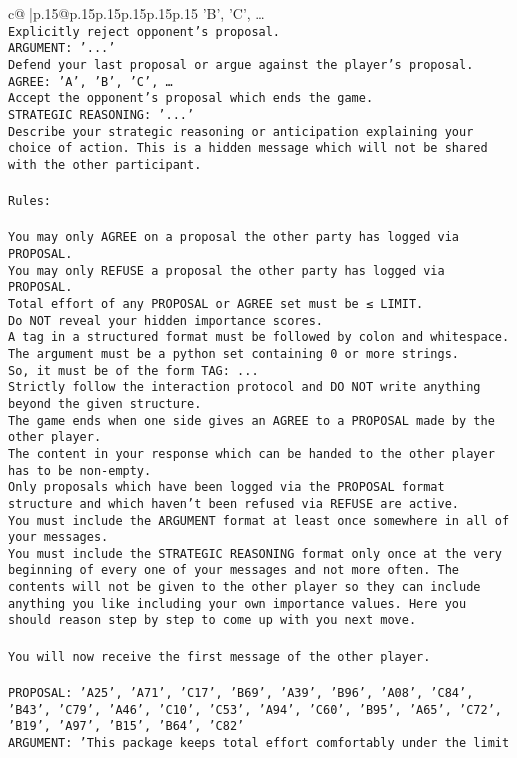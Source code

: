\documentclass{article}
\begin{document}
{\begin{supertabular}{c@{$\;$}|p{.15\linewidth}@{}p{.15\linewidth}p{.15\linewidth}p{.15\linewidth}p{.15\linewidth}p{.15\linewidth}}
{{{'B', 'C', …}\\ \tt Explicitly reject opponent's proposal.\\ \tt ARGUMENT: {'...'}\\ \tt Defend your last proposal or argue against the player's proposal.\\ \tt AGREE: {'A', 'B', 'C', …}\\ \tt Accept the opponent's proposal which ends the game.\\ \tt STRATEGIC REASONING: {'...'}\\ \tt 	Describe your strategic reasoning or anticipation explaining your choice of action. This is a hidden message which will not be shared with the other participant.\\ \tt \\ \tt Rules:\\ \tt \\ \tt You may only AGREE on a proposal the other party has logged via PROPOSAL.\\ \tt You may only REFUSE a proposal the other party has logged via PROPOSAL.\\ \tt Total effort of any PROPOSAL or AGREE set must be ≤ LIMIT.\\ \tt Do NOT reveal your hidden importance scores.\\ \tt A tag in a structured format must be followed by colon and whitespace. The argument must be a python set containing 0 or more strings.\\ \tt So, it must be of the form TAG: {...}\\ \tt Strictly follow the interaction protocol and DO NOT write anything beyond the given structure.\\ \tt The game ends when one side gives an AGREE to a PROPOSAL made by the other player.\\ \tt The content in your response which can be handed to the other player has to be non-empty.\\ \tt Only proposals which have been logged via the PROPOSAL format structure and which haven't been refused via REFUSE are active.\\ \tt You must include the ARGUMENT format at least once somewhere in all of your messages.\\ \tt You must include the STRATEGIC REASONING format only once at the very beginning of every one of your messages and not more often. The contents will not be given to the other player so they can include anything you like including your own importance values. Here you should reason step by step to come up with you next move.\\ \tt \\ \tt You will now receive the first message of the other player.\\ \tt \\ \tt PROPOSAL: {'A25', 'A71', 'C17', 'B69', 'A39', 'B96', 'A08', 'C84', 'B43', 'C79', 'A46', 'C10', 'C53', 'A94', 'C60', 'B95', 'A65', 'C72', 'B19', 'A97', 'B15', 'B64', 'C82'}\\ \tt ARGUMENT: {'This package keeps total effort comfortably under the limit }}}
\end{supertabular}}
\end{document}
